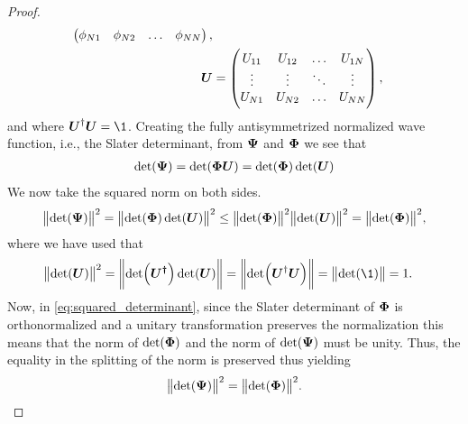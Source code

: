 \begin{proof}
\begin{align}
\begin{pmatrix}
                        \phi_{N1} & \phi_{N2} & \dots & \phi_{NN}
                    \end{pmatrix}, \\
                    \boldsymbol{U}
                    &= \begin{pmatrix}
                        U_{11} & U_{12} & \dots & U_{1N} \\
                        \vdots & \vdots & \ddots & \vdots \\
                        U_{N1} & U_{N2} & \dots & U_{NN}
                    \end{pmatrix},
                \end{align}
                and where $\vfg{U}^{\dagger}\vfg{U} = \1$.
                Creating the fully antisymmetrized normalized wave function, i.e.,
                the Slater determinant, from $\boldsymbol{\Psi}$ and $\boldsymbol{\Phi}$ we see
                that
                \begin{gather}
                    \det(\boldsymbol{\Psi}) = \det(\boldsymbol{\Phi}\boldsymbol{U})
                    = \det(\boldsymbol{\Phi})\det(\boldsymbol{U})
                \end{gather}
                We now take the squared norm on both sides.
                \begin{align}
                    \norm{\det(\boldsymbol{\Psi})}^2
                    = \norm{\det(\boldsymbol{\Phi})\det(\boldsymbol{U})}^2
                    \leq
                    \norm{\det(\boldsymbol{\Phi})}^2\norm{\det(\boldsymbol{U})}^2
                    = \norm{\det(\boldsymbol{\Phi})}^2,
                    \label{eq:squared_determinant}
                \end{align}
                where we have used that
                \begin{align}
                    \norm{\det(\vfg{U})}^2
                    &= \norm{\det(\vfg{U^{\dagger}})\det(\vfg{U})}
                    = \norm{\det(\vfg{U}^{\dagger}\vfg{U})}
                    = \norm{\det(\1)} = 1.
                \end{align}
                Now, in \autoref{eq:squared_determinant}, since the Slater
                determinant of $\boldsymbol{\Phi}$ is orthonormalized and a unitary
                transformation preserves the normalization this means that the norm
                of $\det(\boldsymbol{\Phi})$ and the norm of $\det(\boldsymbol{\Psi})$ must be
                unity.  Thus, the equality in the splitting of the norm is preserved
                thus yielding
                \begin{gather}
                    \norm{\det(\boldsymbol{\Psi})}^2 = \norm{\det(\boldsymbol{\Phi})}^2.
                \end{gather}
            \end{proof}

